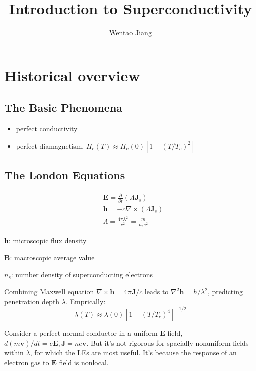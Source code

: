 \documentclass[8pt,a4paper,twocolumn]{article} %
\numberwithin{equation}{section} %
\begin{document}
\small
	\title{Introduction to Superconductivity}
	\author{Wentao Jiang}
	\date{}
	\maketitle
	\tableofcontents

	\section{Historical overview} %
	\label{sec:historical_overview}
		\subsection{The Basic Phenomena} %
		\label{sub:the_basic_phenomena}
			\begin{itemize}
				\item perfect conductivity
				\item perfect diamagnetism, $H_c(T) \approx H_c(0)\left[ 1-(T/T_c)^2 \right]$
			\end{itemize}


		\subsection{The London Equations} %
		\label{sub:the_london_equations}
			\begin{align}
				&\bm E = \frac{\partial}{\partial t}( \Lambda \bm J_s )\\
				&\bm h = -c \nabla\times (\Lambda \bm J_s)\\
				&\Lambda = \frac{4 \pi \lambda^2}{c^2}=\frac{m}{n_s e^2}
			\end{align}

			$\bm h$: microscopic flux density

			$\bm B$: macroscopic average value

			$n_s$: number density of superconducting electrons

			Combining Maxwell equation $ \nabla\times \bm h=4 \pi \bm J/c$ leads to $\nabla^2 \bm h = h/\lambda^2$, predicting penetration depth $ \lambda $. Emprically:
			\begin{equation}
				\lambda(T)\approx \lambda(0)\left[ 1-(T/T_c)^4 \right]^{-1/2}
			\end{equation}

			Consider a perfect normal conductor in a uniform $\bm E$ field, $d(m\bm v)/dt = e\bm E,\bm J=ne\bm v$. But it's not rigorous for spacially nonuniform fields within $\lambda$, for which the LEs are most useful. It's because the response of an electron gas to $\bm E$ field is nonlocal.
\end{document}

